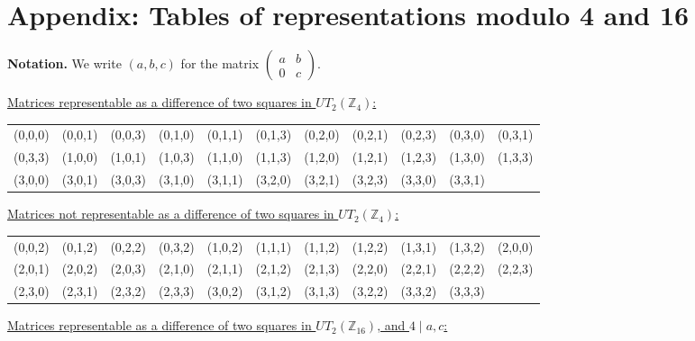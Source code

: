\documentclass[11pt]{amsart}
\def\Z{\mathbb{Z}}
\begin{document}
\section*{Appendix: Tables of representations modulo 4 and 16}

\noindent\textbf{Notation.} We write $(a,b,c)$ for the matrix 
$\begin{pmatrix} a & b \\ 0 & c \end{pmatrix}$.

\noindent\underline{Matrices representable as a difference of two squares in $UT_2(\Z_4)$:}

{\tiny
\begin{tabular}{ccccccccccc}
(0,0,0) & (0,0,1) & (0,0,3) & (0,1,0) & (0,1,1) & (0,1,3) & (0,2,0) & (0,2,1) & (0,2,3) & (0,3,0) & (0,3,1) \\
(0,3,3) & (1,0,0) & (1,0,1) & (1,0,3) & (1,1,0) & (1,1,3) & (1,2,0) & (1,2,1) & (1,2,3) & (1,3,0) & (1,3,3) \\
(3,0,0) & (3,0,1) & (3,0,3) & (3,1,0) & (3,1,1) & (3,2,0) & (3,2,1) & (3,2,3) & (3,3,0) & (3,3,1) & \\
\end{tabular}}



  
\noindent\underline{Matrices not representable as a difference of two squares in $UT_2(\Z_4)$:}

{\tiny
\begin{tabular}{ccccccccccc}
(0,0,2)&(0,1,2)&(0,2,2)&(0,3,2)&(1,0,2)&(1,1,1)&(1,1,2)&(1,2,2)&(1,3,1)&(1,3,2)&(2,0,0)\\
(2,0,1)&(2,0,2)&(2,0,3)&(2,1,0)&(2,1,1)&(2,1,2)&(2,1,3)&(2,2,0)&(2,2,1)&(2,2,2)&(2,2,3)\\
(2,3,0)&(2,3,1)&(2,3,2)&(2,3,3)&(3,0,2)&(3,1,2)&(3,1,3)&(3,2,2)&(3,3,2)&(3,3,3)&
\end{tabular}
}


\noindent\underline{Matrices representable as a difference of two squares in $UT_2(\Z_{16})$, and $4\mid a,c$:}
\end{document}
